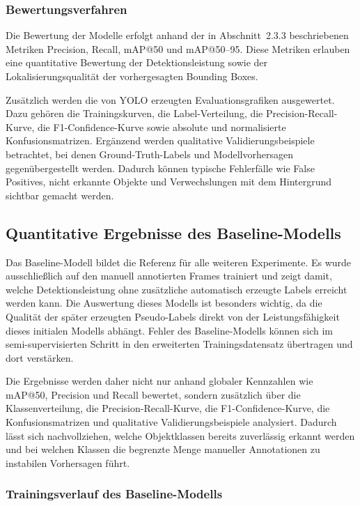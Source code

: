 \subsubsection{Bewertungsverfahren}

Die Bewertung der Modelle erfolgt anhand der in Abschnitt~2.3.3 beschriebenen Metriken Precision, Recall, mAP@50 und mAP@50--95. Diese Metriken erlauben eine quantitative Bewertung der Detektionsleistung sowie der Lokalisierungsqualität der vorhergesagten Bounding Boxes.

Zusätzlich werden die von YOLO erzeugten Evaluationsgrafiken ausgewertet. Dazu gehören die Trainingskurven, die Label-Verteilung, die Precision-Recall-Kurve, die F1-Confidence-Kurve sowie absolute und normalisierte Konfusionsmatrizen. Ergänzend werden qualitative Validierungsbeispiele betrachtet, bei denen Ground-Truth-Labels und Modellvorhersagen gegenübergestellt werden. Dadurch können typische Fehlerfälle wie False Positives, nicht erkannte Objekte und Verwechslungen mit dem Hintergrund sichtbar gemacht werden.

\subsection{Quantitative Ergebnisse des Baseline-Modells}

Das Baseline-Modell bildet die Referenz für alle weiteren Experimente. Es wurde ausschließlich auf den manuell annotierten Frames trainiert und zeigt damit, welche Detektionsleistung ohne zusätzliche automatisch erzeugte Labels erreicht werden kann. Die Auswertung dieses Modells ist besonders wichtig, da die Qualität der später erzeugten Pseudo-Labels direkt von der Leistungsfähigkeit dieses initialen Modells abhängt. Fehler des Baseline-Modells können sich im semi-supervisierten Schritt in den erweiterten Trainingsdatensatz übertragen und dort verstärken.

Die Ergebnisse werden daher nicht nur anhand globaler Kennzahlen wie mAP@50, Precision und Recall bewertet, sondern zusätzlich über die Klassenverteilung, die Precision-Recall-Kurve, die F1-Confidence-Kurve, die Konfusionsmatrizen und qualitative Validierungsbeispiele analysiert. Dadurch lässt sich nachvollziehen, welche Objektklassen bereits zuverlässig erkannt werden und bei welchen Klassen die begrenzte Menge manueller Annotationen zu instabilen Vorhersagen führt.

\subsubsection{Trainingsverlauf des Baseline-Modells}

